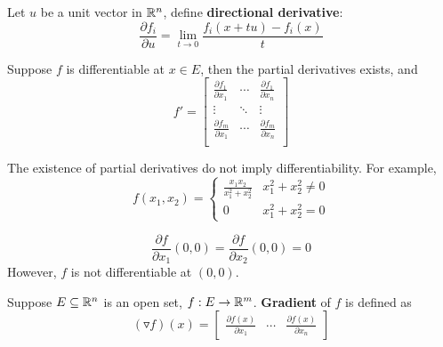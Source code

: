     \begin{defi}
        Let $u$ be a unit vector in $\mathbb{R}^n$, define \textbf{directional derivative}:
        \begin{equation}
            \frac{\partial f_i}{\partial u} = \lim_{t \to 0} \frac{f_i(x + tu)-f_i(x)}{t}
        \end{equation}
    \end{defi}

    \begin{theo}
        Suppose $f$ is differentiable at $x \in E$, then the partial derivatives exists, and
        \begin{equation}
            f' = \begin{bmatrix}
                \frac{\partial f_1}{\partial x_1} & \cdots & \frac{\partial f_1}{\partial x_n} \\
                \vdots & \ddots & \vdots \\
                \frac{\partial f_m}{\partial x_1} & \cdots & \frac{\partial f_m}{\partial x_n} \\
            \end{bmatrix}
        \end{equation}
    \end{theo}

    \begin{rem}
        The existence of partial derivatives do not imply differentiability. For example,
        \begin{equation}
            f(x_1,x_2)
            = \begin{cases}
                \frac{x_1x_2}{x_1^2+x_2^2} & x_1^2 + x_2^2 \neq 0 \\ 
                0 & x_1^2 + x_2^2 = 0
            \end{cases}
        \end{equation}

        \begin{equation}
            \frac{\partial f}{\partial x_1}
            (0,0) = \frac{\partial f}{\partial x_2}
            (0,0) = 0
        \end{equation}
        However, $f$ is not differentiable at $(0,0)$.
    \end{rem}

    \begin{defi}
        Suppose $E \subseteq \mathbb{R}^n$ is an open set, $f: E \to \mathbb{R}^m$. \textbf{Gradient} of $f$ is defined as
        \begin{equation}
            (\triangledown f)(x) =
            \begin{bmatrix}
                \frac{\partial f(x)}{\partial x_1} & \cdots & \frac{\partial f(x)}{\partial x_n}
            \end{bmatrix}
        \end{equation}
    \end{defi}

